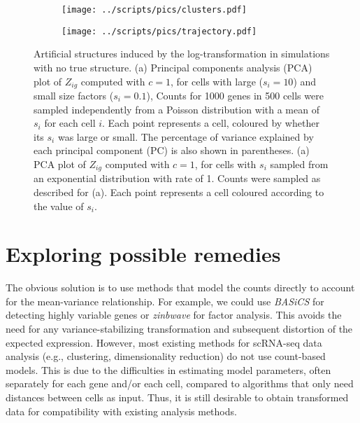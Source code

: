 \documentclass[10pt,letterpaper]{article}
\begin{document}
\begin{figure}[btp]
\centering
\begin{subfigure}[b]{0.49\textwidth}
    \texttt{[image: ../scripts/pics/clusters.pdf]}
    \caption{}
\end{subfigure}
\begin{subfigure}[b]{0.49\textwidth}
    \texttt{[image: ../scripts/pics/trajectory.pdf]}
    \caption{}
\end{subfigure}
\caption{Artificial structures induced by the log-transformation in simulations with no true structure.
(a) Principal components analysis (PCA) plot of $Z_{ig}$ computed with $c=1$, for cells with large ($s_i =10$) and small size factors ($s_i=0.1$), 
Counts for 1000 genes in 500 cells were sampled independently from a Poisson distribution with a mean of $s_i$ for each cell $i$. 
Each point represents a cell, coloured by whether its $s_i$ was large or small.
The percentage of variance explained by each principal component (PC) is also shown in parentheses. 
(a) PCA plot of $Z_{ig}$ computed with $c=1$, for cells with $s_i$ sampled from an exponential distribution with rate of 1.
Counts were sampled as described for (a).
Each point represents a cell coloured according to the value of $s_i$.
}
\label{fig:structures}
\end{figure}

\section{Exploring possible remedies}
The obvious solution is to use methods that model the counts directly to account for the mean-variance relationship.
For example, we could use \textit{BASiCS} \cite{vallejos2016beyond} for detecting highly variable genes or \textit{zinbwave} \cite{risso2018general} for factor analysis.
This avoids the need for any variance-stabilizing transformation and subsequent distortion of the expected expression.
However, most existing methods for scRNA-seq data analysis (e.g., clustering, dimensionality reduction) do not use count-based models.
This is due to the difficulties in estimating model parameters, often separately for each gene and/or each cell,
compared to algorithms that only need distances between cells as input.
Thus, it is still desirable to obtain transformed data for compatibility with existing analysis methods.
\end{document}
